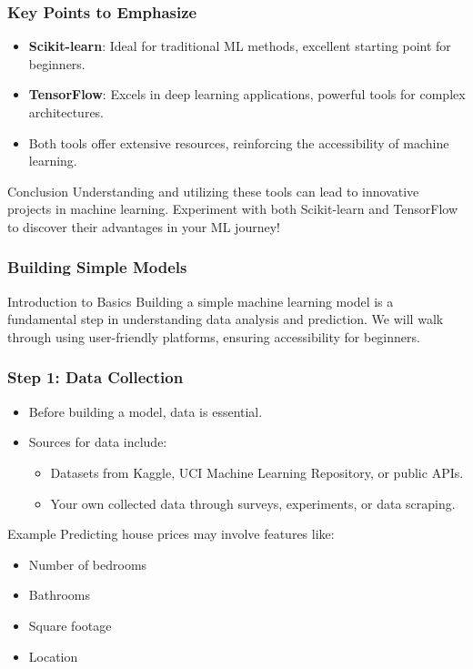 \documentclass[aspectratio=169]{beamer}
\begin{document}
\begin{frame}
    \frametitle{Key Points to Emphasize}
    \begin{itemize}
        \item \textbf{Scikit-learn}: Ideal for traditional ML methods, excellent starting point for beginners.
        \item \textbf{TensorFlow}: Excels in deep learning applications, powerful tools for complex architectures.
        \item Both tools offer extensive resources, reinforcing the accessibility of machine learning.
    \end{itemize}
    
    \begin{block}{Conclusion}
        Understanding and utilizing these tools can lead to innovative projects in machine learning. Experiment with both Scikit-learn and TensorFlow to discover their advantages in your ML journey!
    \end{block}
\end{frame}

\begin{frame}
    \frametitle{Building Simple Models}
    \begin{block}{Introduction to Basics}
        Building a simple machine learning model is a fundamental step in understanding data analysis and prediction. We will walk through using user-friendly platforms, ensuring accessibility for beginners.
    \end{block}
\end{frame}

\begin{frame}[fragile]
    \frametitle{Step 1: Data Collection}
    \begin{itemize}
        \item Before building a model, data is essential.
        \item Sources for data include:
            \begin{itemize}
                \item Datasets from Kaggle, UCI Machine Learning Repository, or public APIs.
                \item Your own collected data through surveys, experiments, or data scraping.
            \end{itemize}
    \end{itemize}
    \begin{block}{Example}
        Predicting house prices may involve features like:
        \begin{itemize}
            \item Number of bedrooms
            \item Bathrooms
            \item Square footage
            \item Location
        \end{itemize}
    \end{block}
\end{frame}
\end{document}
